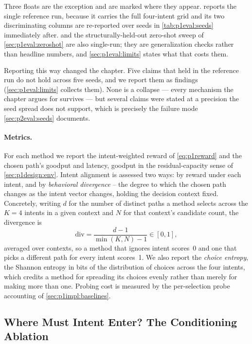 Three floats are the exception and are marked where they appear.  reports the
single reference run, because it carries the full four-intent grid and its two discriminating columns
are re-reported over seeds in \cref{tab:p1eval:seeds} immediately after.  and
the structurally-held-out zero-shot sweep of \cref{sec:p1eval:zeroshot} are also single-run; they are
generalization checks rather than headline numbers, and \cref{sec:p1eval:limits} states what that
costs them.

Reporting this way changed the chapter. Five claims that held in the reference run do not hold across
five seeds, and we report them as findings (\cref{sec:p1eval:limits} collects them). None is a collapse --- every mechanism the chapter argues for
survives --- but several claims were stated at a precision the seed spread does not support, which is
precisely the failure mode \cref{sec:p2eval:seeds} documents.

\paragraph{Metrics.} For each method we report the intent-weighted reward of \cref{eq:p1reward} and the
chosen path's goodput and latency, goodput in the residual-capacity sense of \cref{sec:p1design:env}.
Intent alignment is assessed two ways: by reward under each
intent, and by \emph{behavioral divergence} -- the degree to which the chosen path changes as the intent
vector changes, holding the decision context fixed. Concretely, writing $d$ for the number of distinct
paths a method selects across the $K = 4$ intents in a given context and $N$ for that context's candidate
count, the divergence is
\begin{equation}
\mathrm{div} = \frac{d - 1}{\min(K, N) - 1} \in [0,1],
\label{eq:p1divergence}
\end{equation}
averaged over contexts, so a method that ignores intent scores~0 and one that picks a different path for
every intent scores~1. We also report the \emph{choice entropy}, the Shannon entropy in bits of the
distribution of choices across the four intents, which credits a method for spreading its choices evenly
rather than merely for making more than one. Probing cost is measured by the per-selection probe
accounting of \cref{sec:p1impl:baselines}.

\subsection{Where Must Intent Enter? The Conditioning Ablation}
\label{sec:p1eval:ablation}

